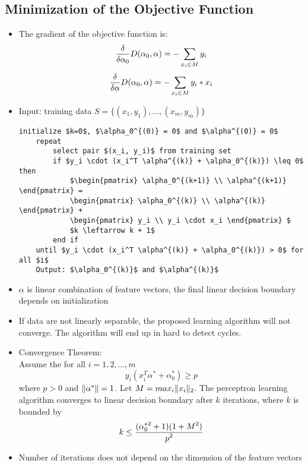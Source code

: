 \subsection*{Minimization of the Objective Function}
\begin{itemize}
    \item
        The gradient of the objective function is:
        $$\frac{\displaystyle \delta}{\displaystyle \delta \alpha_0} D(\alpha_0, \alpha) = - \sum_{x_i \in M} y_i$$ 
        $$\frac{\displaystyle \delta}{\displaystyle \delta \alpha} D(\alpha_0, \alpha) = - \sum_{x_i \in M} y_i * x_i$$
    \item
        Input: training data $S = \{(x_1, y_1), \dots, (x_m, y_m)\}$
    \begin{lstlisting}[mathescape]
    initialize $k=0$, $\alpha_0^{(0)} = 0$ and $\alpha^{(0)} = 0$
    repeat
        select pair $(x_i, y_i)$ from training set
        if $y_i \cdot (x_i^T \alpha^{(k)} + \alpha_0^{(k)}) \leq 0$ then
            $\begin{pmatrix} \alpha_0^{(k+1)} \\ \alpha^{(k+1)} \end{pmatrix} =
            \begin{pmatrix} \alpha_0^{(k)} \\ \alpha^{(k)} \end{pmatrix} + 
            \begin{pmatrix} y_i \\ y_i \cdot x_i \end{pmatrix} $
            $k \leftarrow k + 1$
        end if
    until $y_i \cdot (x_i^T \alpha^{(k)} + \alpha_0^{(k)}) > 0$ for all $i$
    Output: $\alpha_0^{(k)}$ and $\alpha^{(k)}$
    \end{lstlisting}
    \item
        $\alpha$ is linear combination of feature vectors, the final linear decision boundary depends on initialization
    \item
        If data are not linearly separable, the proposed learning algorithm will not converge. The algorithm will end up in hard to detect cycles.
    \item
        Convergence Theorem:\\
        Assume the for all $i = 1,2,\dots,m$
        $$ y_i (x_i^T \alpha^* + \alpha_0^*) \geq p $$
        where $p > 0$ and $\lVert\alpha^*\rVert = 1$. Let $M = max_i \lVert x_i\rVert_2$.
        The perceptron learning algorithm converges to linear decision boundary after $k$ iterations, where $k$ is bounded by
        $$ k \leq \frac{\displaystyle (\alpha_0^{*2} + 1)(1+M^2)}{\displaystyle p^2} $$
    \item
        Number of iterations does not depend on the dimension of the feature vectors
\end{itemize}

